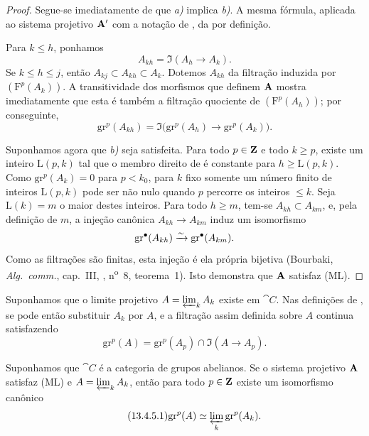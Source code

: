 \begin{proof}
Segue-se imediatamente de  que \emph{a)} implica
\emph{b)}. A mesma fórmula, aplicada ao sistema projetivo
$\mathbf{A}'$ com a notação de , da
 por definição.

Para $k\leq h$, ponhamos
\[
  A_{kh}=\Im(A_h\longrightarrow A_k).
\]
Se $k\leq h\leq j$, então
$A_{kj}\subset A_{kh}\subset A_k$.
Dotemos $A_{kh}$ da filtração induzida por
$(\mathrm{F}^p(A_k))$.
A transitividade dos morfismos que definem $\mathbf{A}$ mostra
imediatamente que esta é também a filtração quociente de
$(\mathrm{F}^p(A_h))$; por conseguinte,
\begin{equation}
\label{0.13.4.3.2}
\tag{13.4.3.2}
  \mathrm{gr}^p(A_{kh})
  =
  \Im\bigl(
    \mathrm{gr}^p(A_h)\longrightarrow\mathrm{gr}^p(A_k)
  \bigr).
\end{equation}

Suponhamos agora que \emph{b)} seja satisfeita.
Para todo $p\in\mathbf{Z}$ e todo $k\geq p$, existe um inteiro
$\mathrm{L}(p,k)$ tal que o membro direito de
 é constante para $h\geq\mathrm{L}(p,k)$.
Como $\mathrm{gr}^p(A_k)=0$ para $p<k_0$, para $k$ fixo somente
um número finito de inteiros $\mathrm{L}(p,k)$ pode ser não nulo quando
$p$ percorre os inteiros $\leq k$.
Seja $\mathrm{L}(k)=m$ o maior destes inteiros.
Para todo $h\geq m$, tem-se
$A_{kh}\subset A_{km}$, e, pela definição de $m$, a injeção
canônica
$A_{kh}\longrightarrow A_{km}$ induz um isomorfismo
\[
  \mathrm{gr}^\bullet(A_{kh})
  \xrightarrow{\sim}
  \mathrm{gr}^\bullet(A_{km}).
\]
Como as filtrações são finitas, esta injeção é ela própria bijetiva
(Bourbaki, \emph{Alg.\ comm.}, cap.~III, ,
n\textsuperscript{o}~8, teorema~1).
Isto demonstra que $\mathbf{A}$ satisfaz (ML).
\end{proof}

\begin{env}[13.4.4]
\label{0.13.4.4}
Suponhamos que o limite projetivo
$A=\varprojlim_k A_k$ existe em $\cat{C}$.
Nas definições de , se pode então substituir $A_k$
por $A$, e a filtração assim definida sobre $A$ continua satisfazendo
\begin{equation}
\label{0.13.4.4.1}
\tag{13.4.4.1}
  \mathrm{gr}^p(A)
  =
  \mathrm{gr}^p(A_p)
  \cap
  \Im(A\longrightarrow A_p).
\end{equation}
\end{env}

\begin{corollary}[13.4.5]
\label{0.13.4.5}
Suponhamos que $\cat{C}$ é a categoria de grupos abelianos.
Se o sistema projetivo $\mathbf{A}$ satisfaz (ML) e
$A=\varprojlim_k A_k$, então para todo $p\in\mathbf{Z}$ existe um
isomorfismo canônico
\begin{equation}
\label{0.13.4.5.1}
\tag{13.4.5.1}
  \mathrm{gr}^p(A)
  \isoto
  \varprojlim_k\mathrm{gr}^p(A_k).
\end{equation}
\end{corollary}

